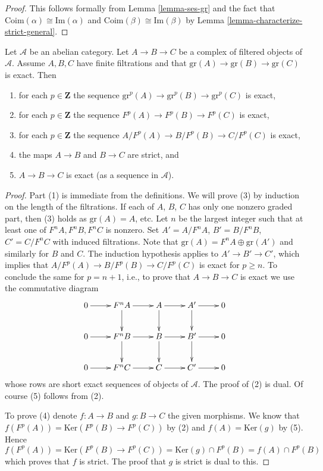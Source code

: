 \begin{proof}
This follows formally from
Lemma \ref{lemma-ses-gr}
and the fact that
$\text{Coim}(\alpha) \cong \text{Im}(\alpha)$ and
$\text{Coim}(\beta) \cong \text{Im}(\beta)$ by
Lemma \ref{lemma-characterize-strict-general}.
\end{proof}

\begin{lemma}
\label{lemma-filtered-acyclic}
Let $\mathcal{A}$ be an abelian category.
Let $A \to B \to C$ be a complex of filtered objects of $\mathcal{A}$.
Assume $A, B, C$ have finite filtrations and that
$\text{gr}(A) \to \text{gr}(B) \to \text{gr}(C)$ is exact.
Then
\begin{enumerate}
\item for each $p \in \mathbf{Z}$ the sequence
$\text{gr}^p(A) \to \text{gr}^p(B) \to \text{gr}^p(C)$ is exact,
\item for each $p \in \mathbf{Z}$ the sequence
$F^p(A) \to F^p(B) \to F^p(C)$ is exact,
\item for each $p \in \mathbf{Z}$ the sequence
$A/F^p(A) \to B/F^p(B) \to C/F^p(C)$ is exact,
\item the maps $A \to B$ and $B \to C$ are strict, and
\item $A \to B \to C$ is exact (as a sequence in $\mathcal{A}$).
\end{enumerate}
\end{lemma}

\begin{proof}
Part (1) is immediate from the definitions.
We will prove (3) by induction on the length of the filtrations.
If each of $A$, $B$, $C$ has only one
nonzero graded part, then (3) holds as $\text{gr}(A) = A$, etc.
Let $n$ be the largest integer such that at least one of
$F^nA, F^nB, F^nC$ is nonzero. Set $A' = A/F^nA$, $B' = B/F^nB$,
$C' = C/F^nC$ with induced filtrations. Note that
$\text{gr}(A) = F^nA \oplus \text{gr}(A')$
and similarly for $B$ and $C$. The induction hypothesis
applies to $A' \to B' \to C'$, which implies that
$A/F^p(A) \to B/F^p(B) \to C/F^p(C)$ is exact for $p \geq n$.
To conclude the same for $p = n + 1$, i.e., to prove that $A \to B \to C$
is exact we use the commutative diagram
$$
\xymatrix{
0 \ar[r] & F^nA \ar[r] \ar[d] & A \ar[r] \ar[d] & A' \ar[r] \ar[d] & 0 \\
0 \ar[r] & F^nB \ar[r] \ar[d] & B \ar[r] \ar[d] & B' \ar[r] \ar[d] & 0 \\
0 \ar[r] & F^nC \ar[r] & C \ar[r] & C' \ar[r] & 0
}
$$
whose rows are short exact sequences of objects of $\mathcal{A}$.
The proof of (2) is dual. Of course (5) follows from (2).

\medskip\noindent
To prove (4) denote $f : A \to B$ and $g : B \to C$ the given morphisms.
We know that $f(F^p(A)) = \text{Ker}(F^p(B) \to F^p(C))$ by (2) and
$f(A) = \text{Ker}(g)$ by (5). Hence
$f(F^p(A)) =  \text{Ker}(F^p(B) \to F^p(C)) =
\text{Ker}(g) \cap F^p(B) = f(A) \cap F^p(B)$ which proves that
$f$ is strict. The proof that $g$ is strict is dual to this.
\end{proof}











